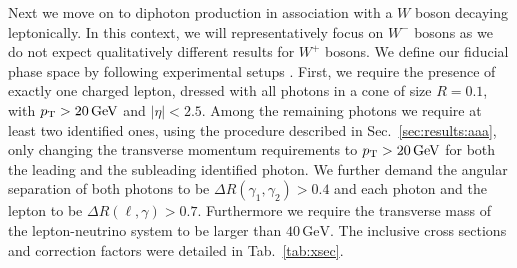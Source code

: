Next we move on to diphoton production in association with 
a $W$ boson decaying leptonically.
In this context, we will representatively focus on $W^-$ bosons 
as we do not expect qualitatively different results for $W^+$ 
bosons. 
We define our fiducial phase space by following experimental setups \cite{Aad:2015uqa}. 
First, we require the presence of exactly one charged lepton, 
dressed with all photons in a cone of size $R=0.1$, with 
$p_\text{T}>20\,\text{GeV}$ and $|\eta|<2.5$. 
Among the remaining photons we require at least two identified 
ones, using the procedure described in Sec.\ \ref{sec:results:aaa}, 
only changing the transverse momentum requirements to 
$p_\text{T}>20\,\text{GeV}$ for both the leading and the subleading 
identified photon. 
We further demand the angular separation of both photons 
to be $\Delta R(\gamma_1,\gamma_2)>0.4$ and each photon and 
the lepton to be $\Delta R(\ell,\gamma)>0.7$.
Furthermore we require the transverse mass of the lepton-neutrino system
to be larger than $40\, \text{GeV}$.
The inclusive cross sections and correction factors were 
detailed in Tab.\ \ref{tab:xsec}.



